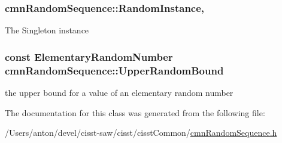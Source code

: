 \subsubsection[{Random\+Instance}]{ cmn\+Random\+Sequence\+::\+Random\+Instance\hspace{0.3cm}{\ttfamily [static]}, {\ttfamily [protected]}}\label{classcmn_random_sequence_a04d180901d880761b49e6c61b79423f3}
The Singleton instance \hypertarget{classcmn_random_sequence_a42566669e8703c6846ce41e286f62e67}{}
\subsubsection[{Upper\+Random\+Bound}]{\setlength{\rightskip}{0pt plus 5cm}const {\bf Elementary\+Random\+Number} cmn\+Random\+Sequence\+::\+Upper\+Random\+Bound\hspace{0.3cm}{\ttfamily [static]}}\label{classcmn_random_sequence_a42566669e8703c6846ce41e286f62e67}
the upper bound for a value of an elementary random number 

The documentation for this class was generated from the following file\+:\begin{DoxyCompactItemize}
\item 
/\+Users/anton/devel/cisst-\/saw/cisst/cisst\+Common/\hyperlink{cmn_random_sequence_8h}{cmn\+Random\+Sequence.\+h}\end{DoxyCompactItemize}
